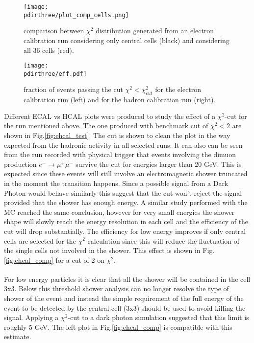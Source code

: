 \begin{figure}[h!]
  \begin{center}
    \texttt{[image: \\pdirthree/plot\_comp\_cells.png]}
  \end{center}
  \caption[comparison between $\chi^2$ distribution for different ECAL configurations]{comparison between $\chi^2$ distribution generated from an electron calibration run considering only central cells (black) and considering all 36 cells (red).}
  \label{fig:chi}
\end{figure}

\begin{figure}[h!]
  \begin{center}
    \texttt{[image: \\pdirthree/eff.pdf]}
  \end{center}
  \caption[fraction of events passing the $\chi^2$ cut]{fraction of events passing the cut $\chi^2 < \chi^2_{cut}$
    for the electron calibration run (left) and for the hadron calibration run (right).}
  \label{fig:eff}
\end{figure}

\clearpage

Different ECAL vs HCAL plots were produced to study the effect of a
$\chi^2$-cut for the run mentioned above. The one produced with
benchmark cut of $\chi^2 < 2$ are shown in
Fig.\ref{fig:ehcal_test}. The cut is shown to clean the plot in the
way expected from the hadronic activity in all selected runs. It can also
can be seen from the run recorded with physical trigger that events involving the dimuon
production $e^- \to \mu^+\mu^-$ survive the cut for energies larger
than 20 GeV.  This is expected since these events will still involve
an electromagnetic shower truncated in the moment the transition
happens. Since a possible signal from a Dark Photon would behave
similarly this suggest that the cut won't reject the signal provided
that the shower has enough energy. A similar study performed with the
MC reached the same conclusion, however for
very small energies the shower shape will slowly reach the energy
resolution in each cell and the efficiency of the cut will drop
substantially.  The efficiency for low energy improves if only central
cells are selected for the $\chi^2$ calculation since this will reduce
the fluctuation of the single cells not involved in the shower. This
effect is shown in Fig.\ref{fig:ehcal_comp} for a cut of 2 on $\chi^2$.
\\
\\
For low energy particles it is clear that all the shower will be
contained in the cell 3x3. Below this threshold shower analysis can no
longer resolve the type of shower of the event and instead the simple
requirement of the full energy of the event to be detected by the
central cell (3x3) should be used to avoid killing the
signal. Applying a $\chi^2$-cut to a dark photon simulation suggested that this limit is roughly 5 GeV.  The
left plot in Fig.\ref{fig:ehcal_comp} is compatible with this
estimate.


